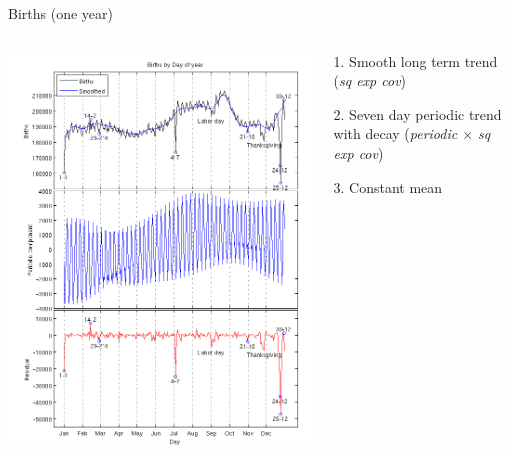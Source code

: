 \documentclass[11pt,ignorenonframetext,]{beamer}
\begin{document}
\begin{frame}{Births (one year)}
\protect\hypertarget{births-one-year}{}

\begin{columns}
\begin{column}{0.5\textwidth}
\begin{center}
\includegraphics[width=\textwidth]{figs/births_pic1.png}
\end{center}
\end{column}
\begin{column}{0.5\textwidth}

1. Smooth long term trend \\ (\textit{sq exp cov})

\vspace{2mm}

2. Seven day periodic trend with decay (\textit{periodic $\times$ sq exp cov})

\vspace{2mm}

3. Constant mean

\end{column}
\end{columns}

\end{frame}
\end{document}
